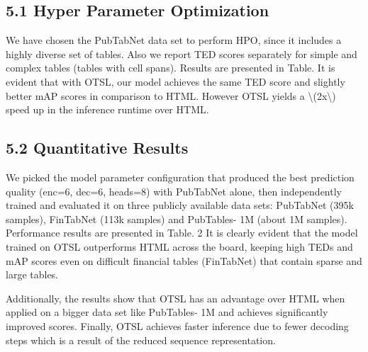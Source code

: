 \documentclass[11pt,a4paper]{article}
\begin{document}
\subsection{5.1 Hyper Parameter Optimization}

We have chosen the PubTabNet data set to perform HPO, since it includes a highly diverse set of tables. Also we report TED scores separately for simple and complex tables (tables with cell spans). Results are presented in Table. It is evident that with OTSL, our model achieves the same TED score and slightly better mAP scores in comparison to HTML. However OTSL yields a \textbackslash{}(2x\textbackslash{}) speed up in the inference runtime over HTML.

\subsection{5.2 Quantitative Results}

We picked the model parameter configuration that produced the best prediction quality (enc=6, dec=6, heads=8) with PubTabNet alone, then independently trained and evaluated it on three publicly available data sets: PubTabNet (395k samples), FinTabNet (113k samples) and PubTables- 1M (about 1M samples). Performance results are presented in Table. 2 It is clearly evident that the model trained on OTSL outperforms HTML across the board, keeping high TEDs and mAP scores even on difficult financial tables (FinTabNet) that contain sparse and large tables.

Additionally, the results show that OTSL has an advantage over HTML when applied on a bigger data set like PubTables- 1M and achieves significantly improved scores. Finally, OTSL achieves faster inference due to fewer decoding steps which is a result of the reduced sequence representation.
\end{document}
